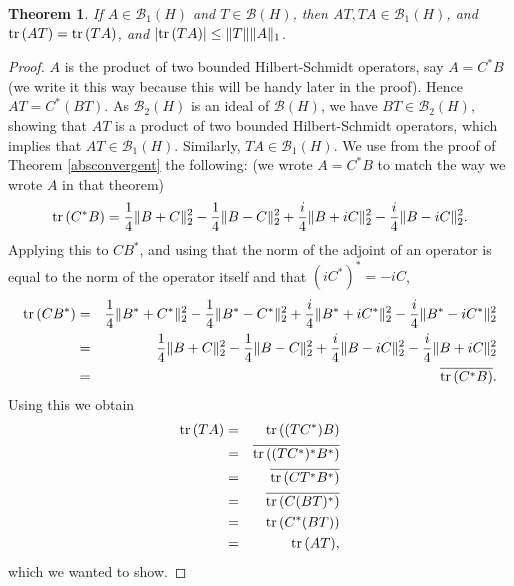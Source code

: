 \documentclass{article}
\newcommand{\tr}{\ensuremath\mathrm{tr}\,}
\newcommand{\norm}[1]{\Vert #1 \Vert}
\newtheorem{theorem}{Theorem}
\begin{document}
\begin{theorem}
If $A \in \mathscr{B}_1(H)$ and $T \in \mathscr{B}(H)$, then $AT, TA \in \mathscr{B}_1(H)$, and $\tr(AT)=\tr(TA)$, and $|\tr(TA)| \leq \norm{T} \norm{A}_1$.
\label{tracesymmetric}
\end{theorem}
\begin{proof}
$A$ is the product of two bounded Hilbert-Schmidt operators, say $A=C^*B$ (we write it this way because this will be handy later in the proof). Hence
$AT=C^*(BT)$. As $\mathscr{B}_2(H)$ is an ideal of $\mathscr{B}(H)$, we have $BT \in \mathscr{B}_2(H)$, showing that
$AT$ is a product of two bounded Hilbert-Schmidt operators, which implies that $AT \in \mathscr{B}_1(H)$.
Similarly, $TA \in \mathscr{B}_1(H)$.
We use from the proof of Theorem \ref{absconvergent} the following: (we wrote $A=C^*B$ to match the way we wrote $A$ in that theorem) 
\[
\tr(C^*B)= \frac{1}{4} \norm{B+C}_2^2 - \frac{1}{4} \norm{B-C}_2^2 + \frac{i}{4} \norm{B+iC}_2^2
 -  \frac{i}{4} \norm{B-iC}_2^2.
\] 
Applying this to $CB^*$, and using that the norm of the adjoint of an operator is equal to the norm of the operator itself and that
$(iC^*)^*=-iC$,
\begin{eqnarray*}
\tr(CB^*)&=&  \frac{1}{4} \norm{B^*+C^*}_2^2 - \frac{1}{4} \norm{B^*-C^*}_2^2 + \frac{i}{4} \norm{B^*+iC^*}_2^2
 -  \frac{i}{4} \norm{B^*-iC^*}_2^2\\
 &=&\frac{1}{4} \norm{B+C}_2^2 - \frac{1}{4} \norm{B-C}_2^2 + \frac{i}{4} \norm{B-iC}_2^2
 -  \frac{i}{4} \norm{B+iC}_2^2\\
 &=&\overline{\tr(C^*B)}.
\end{eqnarray*}
Using this we obtain
\begin{eqnarray*}
\tr(TA)&=&\tr((TC^*)B)\\
&=&\overline{\tr((TC^*)^* B^*)}\\
&=&\overline{\tr(CT^*B^*)}\\
&=&\overline{\tr(C(BT)^*)}\\
&=&\tr(C^*(BT))\\
&=&\tr(AT),
\end{eqnarray*}
which we wanted to show.


\end{proof}
\end{document}
